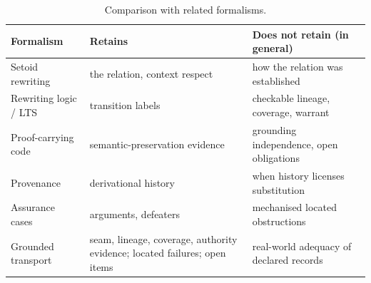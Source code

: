 \begin{table}[t]
\centering\small
\caption{Comparison with related formalisms.}\label{tab:related}
\begin{tabularx}{\textwidth}{@{}lYY@{}}
\toprule
Formalism & Retains & Does not retain (in general) \\
\midrule
Setoid rewriting & the relation, context respect & how the relation was established \\
Rewriting logic / LTS & transition labels & checkable lineage, coverage, warrant \\
Proof-carrying code & semantic-preservation evidence & grounding independence, open obligations \\
Provenance & derivational history & when history licenses substitution \\
Assurance cases & arguments, defeaters & mechanised located obstructions \\
Grounded transport & seam, lineage, coverage, authority evidence; located failures; open items & real-world adequacy of declared records \\
\bottomrule
\end{tabularx}
\end{table}
